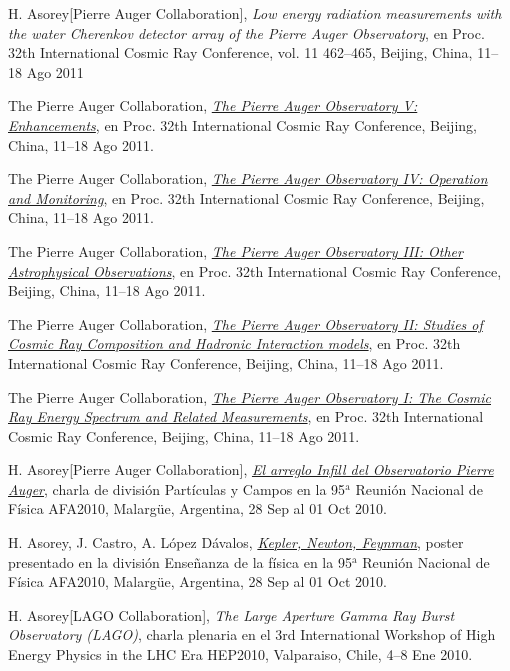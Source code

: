 \documentclass[11pt, a4paper]{article}
\newcommand{\years}[1]{\marginnote{\scriptsize #1}}
\begin{document}
\years{2011}H. Asorey[Pierre Auger Collaboration], {\emph{Low energy radiation
measurements with the water Cherenkov detector array of the Pierre Auger
Observatory}}, en Proc. 32th International Cosmic Ray Conference, vol. 11
462--465, Beijing, China, 11--18 Ago 2011

\years{2011}The Pierre Auger Collaboration,
\href{http://arxiv.org/abs/1107.4807}{\emph{The Pierre Auger Observatory V:
Enhancements}}, en Proc. 32th International Cosmic Ray
Conference, Beijing, China, 11--18 Ago 2011.

\years{2011}The Pierre Auger Collaboration,
\href{http://arxiv.org/abs/1107.4806}{\emph{The Pierre Auger Observatory IV:
Operation and Monitoring}}, en Proc. 32th International Cosmic Ray
Conference, Beijing, China, 11--18 Ago 2011.

\years{2011}The Pierre Auger Collaboration,
\href{http://arxiv.org/abs/1107.4805}{\emph{The Pierre Auger Observatory III:
Other Astrophysical Observations}}, en Proc. 32th International Cosmic Ray
Conference, Beijing, China, 11--18 Ago 2011.

\years{2011}The Pierre Auger Collaboration,
\href{http://arxiv.org/abs/1107.4804}{\emph{The Pierre Auger Observatory II:
Studies of Cosmic Ray Composition and Hadronic Interaction models}}, en Proc.
32th International Cosmic Ray Conference, Beijing, China, 11--18 Ago 2011.

\years{2011}The Pierre Auger Collaboration,
\href{http://arxiv.org/abs/1107.4809}{\emph{The Pierre Auger Observatory I: The
Cosmic Ray Energy Spectrum and Related Measurements}}, en Proc. 32th
International Cosmic Ray Conference, Beijing, China, 11--18 Ago 2011.

\years{2010}H. Asorey[Pierre Auger Collaboration],
\href{http://95rnf.afa.webfactional.com/tex\_files/Resumenes/DPyC/PyC\_6.pdf}{\emph{El
arreglo Infill del Observatorio Pierre Auger}}, charla de división Partículas y
Campos en la 95$^\mathrm{a}$ Reunión Nacional de Física AFA2010, Malargüe,
Argentina, 28 Sep al 01 Oct 2010.

\years{2010}H. Asorey, J. Castro, A. López Dávalos,
\href{http://95rnf.afa.webfactional.com/tex\_files/Resumenes/EF/asorey.pdf}{\emph{Kepler,
Newton, Feynman}}, poster presentado en la división Enseñanza de la física en
la 95$^\mathrm{a}$ Reunión Nacional de Física AFA2010, Malargüe, Argentina, 28
Sep al 01 Oct 2010.

\years{2010}H. Asorey[LAGO Collaboration], {\emph{The Large Aperture Gamma Ray
Burst Observatory (LAGO)}}, charla plenaria en el 3rd International Workshop of
High Energy Physics in the LHC Era HEP2010, Valparaiso, Chile, 4--8 Ene 2010.
\end{document}
